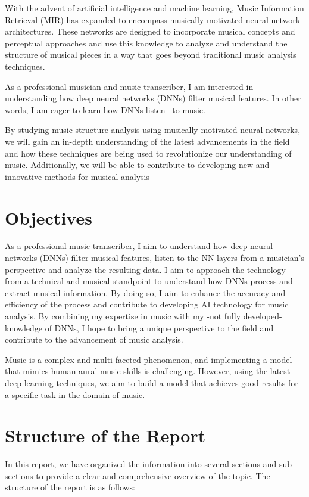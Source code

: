 With the advent of artificial intelligence and machine learning, Music Information Retrieval (MIR) has expanded to encompass musically motivated neural network architectures. These networks are designed to incorporate musical concepts and perceptual approaches and use this knowledge to analyze and understand the structure of musical pieces in a way that goes beyond traditional music analysis techniques.

As a professional musician and music transcriber, I am interested in understanding how deep neural networks (DNNs) filter musical features. In other words, I am eager to learn how DNNs listen~\cite{7500246} to music.

By studying music structure analysis using musically motivated neural networks, we will gain an in-depth understanding of the latest advancements in the field and how these techniques are being used to revolutionize our understanding of music. Additionally, we will be able to contribute to developing new and innovative methods for musical analysis~\cite{Huang2019MusicTG}

\section{Objectives}

As a professional music transcriber, I aim to understand how deep neural networks (DNNs) filter musical features, listen to the NN layers from a musician's perspective and analyze the resulting data. I aim to approach the technology from a technical and musical standpoint to understand how DNNs process and extract musical information. By doing so, I aim to enhance the accuracy and efficiency of the process and contribute to developing AI technology for music analysis. By combining my expertise in music with my -not fully developed- knowledge of DNNs, I hope to bring a unique perspective to the field and contribute to the advancement of music analysis.

Music is a complex and multi-faceted phenomenon, and implementing a model that mimics human aural music skills is challenging. However, using the latest deep learning techniques, we aim to build a model that achieves good results for a specific task in the domain of music.

\section{Structure of the Report}

In this report, we have organized the information into several sections and sub-sections to provide a clear and comprehensive overview of the topic. The structure of the report is as follows:

